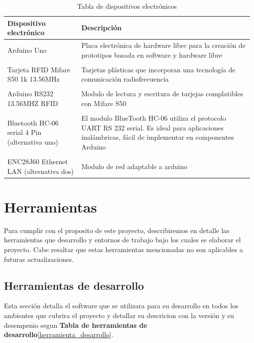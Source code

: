 \documentclass[letter,12pt]{article}
\begin{document}
\begin{table}
	\centering
	\begin{tabularx}{15cm}{X|X}
	Dispositivo electr\'onico 					& Descripci\'on									\\ 
	\hline
	Arduino Uno 								& Placa electr\'onica de hardware libre 
												  para la creaci\'on de prototipos basada en 
												  software y hardware libre                     \\
												& \\  
	Tarjeta RFID Mifare S50 1k 13.56MHz         & Tarjetas plásticas que incorporan una 
												  tecnología de comunicaci\'on radiofrecuencia  \\
												& \\
	Arduino RS232 13.56MHZ RFID 				& Modulo de lectura y escritura de
												  tarjejas complatibles con Mifare S50  		\\
												  & \\												
	Bluetooth HC-06 serial 4 Pin (alternativa uno)& El modulo BlueTooth HC-06 utiliza el protocolo 
												  UART RS 232 serial. Es ideal para 
												  aplicaciones inal\'ambricas, f\'acil de  
												  implementar en componentes Arduino			\\
												  & \\
	ENC28J60 Ethernet LAN (alternativa dos)    	  & Modulo de red adaptable a arduino			\\
	
	\end{tabularx} 
	\caption{Tabla de dispositivos electr\'onicos}		
\end{table}	

\section{Herramientas}
Para cumplir con el proposito de este proyecto, describiremos en detalle las herramientas que desarrollo y entornos de trabajo bajo los cuales se 			elaborar el proyecto. Cabe resaltar que estas herramientas mencionadas no son aplicables a futuras actualizaciones.
	
	\subsection{Herramientas de desarrollo}
	
	Esta secci\'on detalla el software que se utilizara para su desarrollo en todos los ambientes que cubrira el proyecto y detallar su descricion con la versi\'on y su desempenio segun \textbf{Tabla de herramientas de desarrollo}\ref{herramienta_desarrollo}.
	
\end{document}
